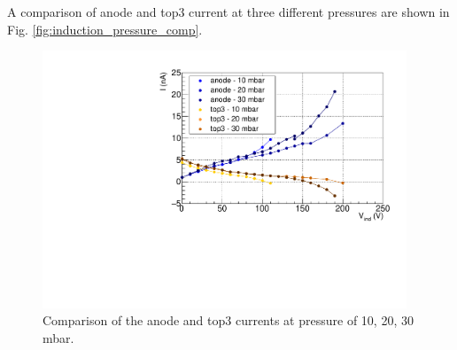 \documentclass[a4paper, 11 pt]{report}
\begin{document}
A comparison of anode and top3 current at three different pressures are shown in Fig. 
\ref{fig:induction_pressure_comp}.
\begin{figure}[!htb]
	\centering
	  \includegraphics[width=0.97\textwidth]{Immagini/InductionScan_FULL_AnodeComp_2.pdf}
	\caption{Comparison of the anode and top3 currents at pressure of 10, 20, 30 mbar.}
	\label{fig:induction_FULLTHGEM_other_pressure}
\end{figure}

\clearpage
\end{document}
